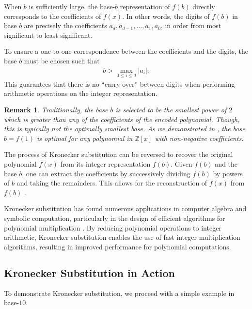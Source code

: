 \documentclass[12pt]{article}
\theoremstyle{plain}
\newtheorem{remark}{Remark}
\theoremstyle{definition}
\begin{document}
When $b$ is sufficiently large, the base-$b$ representation of $f(b)$ directly corresponds to the coefficients of $f(x)$. In other words, the digits of $f(b)$ in base $b$ are precisely the coefficients $a_d, a_{d-1}, \ldots, a_1, a_0$, in order from most significant to least significant.

To ensure a one-to-one correspondence between the coefficients and the digits, the base $b$ must be chosen such that
\begin{align*}
    b > \max_{0 \leq i \leq d} |a_i| .
\end{align*}
This guarantees that there is no ``carry over'' between digits when performing arithmetic operations on the integer representation.

\begin{remark}
Traditionally, the base $b$ is selected to be the smallest power of $2$ which is greater than any of the coefficients of the encoded polynomial. Though, this is typically not the optimally smallest base. As we demonstrated in \cite{shunia2023simple}, the base $b=f(1)$ is optimal for any polynomial in $\mathbb{Z}[x]$ with non-negative coefficients.
\end{remark}

The process of Kronecker substitution can be reversed to recover the original polynomial $f(x)$ from its integer representation $f(b)$. Given $f(b)$ and the base $b$, one can extract the coefficients by successively dividing $f(b)$ by powers of $b$ and taking the remainders. This allows for the reconstruction of $f(x)$ from $f(b)$ \cite{grimaldi2004discrete}.

Kronecker substitution has found numerous applications in computer algebra and symbolic computation, particularly in the design of efficient algorithms for polynomial multiplication \cite{harvey2009kronecker, harvey2014faster}. By reducing polynomial operations to integer arithmetic, Kronecker substitution enables the use of fast integer multiplication algorithms, resulting in improved performance for polynomial computations.

\subsection{Kronecker Substitution in Action}
To demonstrate Kronecker substitution, we proceed with a simple example in base-$10$.
\end{document}
